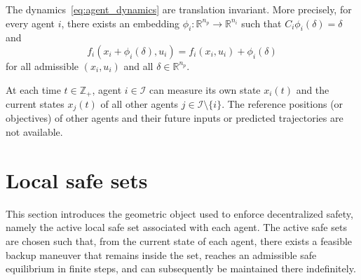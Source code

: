 \documentclass[twocolumn]{autart}
\begin{document}
\begin{assumption}
\label{ass:position_invariance}
The dynamics~\eqref{eq:agent_dynamics} are translation invariant. More precisely, for every agent $i$, there exists an embedding $\phi_i:\mathbb{R}^{n_p}\to\mathbb{R}^{n_i}$ such that $C_i\phi_i(\delta)=\delta$ and
\[
f_i(x_i+\phi_i(\delta),u_i)=f_i(x_i,u_i)+\phi_i(\delta)
\]
for all admissible $(x_i,u_i)$ and all $\delta\in\mathbb{R}^{n_p}$.
\end{assumption}

\begin{assumption}
\label{ass:information_pattern}
At each time $t\in\mathbb{Z}_+$, agent $i\in\mathcal I$ can measure its own state $x_i(t)$ and the current states $x_j(t)$ of all other agents $j\in\mathcal I\setminus\{i\}$. The reference positions (or objectives) of other agents and their future inputs or predicted trajectories are not available.
\end{assumption}

\section{Local safe sets}
\label{sec:local_safe_sets}

This section introduces the geometric object used to enforce decentralized safety, namely the active local safe set associated with each agent. The active safe sets are chosen such that, from the current state of each agent, there exists a feasible backup maneuver that remains inside the set, reaches an admissible safe equilibrium in finite steps, and can subsequently be maintained there indefinitely.
\end{document}

